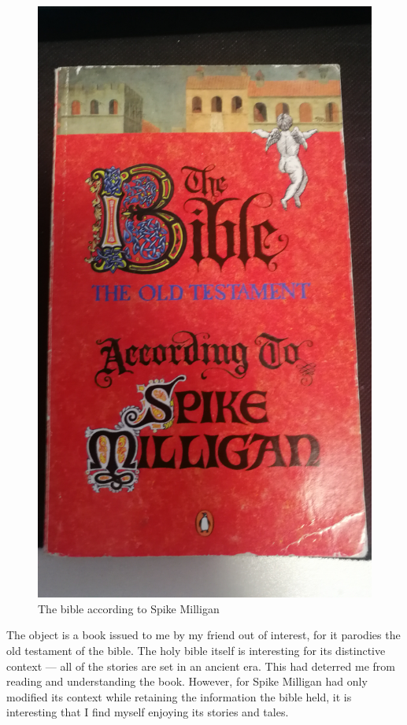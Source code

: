 \documentclass[a4paper,11pt]{article}
\begin{document}
\begin{figure}[H]
 \centering
 \includegraphics[scale=0.07]{bible.jpg}
 \caption{The bible according to Spike Milligan}
 \label{fig:bible}
\end{figure}

The object is a book issued to me by my friend out of interest, for it parodies the old testament of the bible. The holy bible itself is interesting for its distinctive context 
--- all of the stories are set in an ancient era. This had deterred me from reading and understanding the book. However, for Spike Milligan had only modified its context while retaining the information the bible held, it is interesting that I find myself enjoying its stories and tales.
\end{document}
